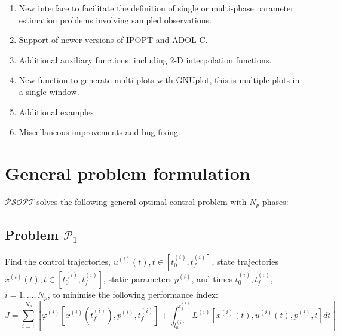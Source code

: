 \documentclass[a4paper,11pt]{report}    %
\newcommand{\psopt}{$\mathcal{PSOPT}$\,}  %
\begin{document}
\begin{enumerate}
 \item New interface to facilitate the definition of single or multi-phase parameter estimation problems involving
sampled observations.
 \item Support of newer versions of IPOPT and ADOL-C.
 \item Additional auxiliary functions, including 2-D interpolation functions.
 \item New function to generate multi-plots with GNUplot, this is multiple plots in a single window.
 \item Additional examples
 \item Miscellaneous improvements and bug fixing.


\end{enumerate}

\section{General problem formulation}

\psopt solves the following general optimal control problem with $N_p$ phases:

\subsection*{Problem $\mathcal{P}_1$} Find the control trajectories, $u^{(i)}(t), t\in [t_0^{(i)}, t_f^{(i)}]$, state trajectories $x^{(i)}(t), t\in [t_0^{(i)}, t_f^{(i)}]$, static parameters $p^{(i)}$, and 
times $t_0^{(i)}, t_f^{(i)}$, $i=1,\ldots,N_p$,  to minimise the following performance index:
\[
   J = \sum\limits_{i=1}^{N_p} \left[ \varphi^{(i)}[ x^{(i)}(t_f^{(i)}), p^{(i)}, t_f^{(i)} ] + \int_{t_0^{(i)}}^{t_f^{(i)}} L^{(i)}[x^{(i)}(t),u^{(i)}(t),p^{(i)},t] dt \right]
\]
\end{document}
